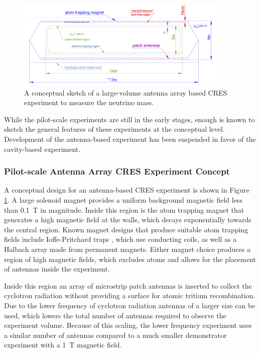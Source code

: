 \begin{figure}[htbp]
    \centering
    \includegraphics*[width=0.9\textwidth]{figs/Chapter-3/phaseiv_concept_sketch_ver2.png}
    \caption{\label{fig:chap3-phaseiv-antenna} A conceptual sketch of a large-volume antenna array based CRES experiment to measure the neutrino mass.}
\end{figure}

While the pilot-scale experiments are still in the early stages, enough is known to sketch the general features of these experiments at the conceptual level. Development of the antenna-based experiment has been suspended in favor of the cavity-based experiment.

\subsubsection*{Pilot-scale Antenna Array CRES Experiment Concept}

A conceptual design for an antenna-based CRES experiment is shown in Figure \ref{fig:chap3-phaseiv-antenna}. A large solenoid magnet provides a uniform background magnetic field less than 0.1~T in magnitude. Inside this region is the atom trapping magnet that generates a high magnetic field at the walls, which decays exponentially towards the central region. 
Known magnet designs that produce suitable atom trapping fields include Ioffe-Pritchard traps \cite{ioffe_trap}, which use conducting coils, as well as a Halbach array \cite{halbach_trap} made from permanent magnets. Either magnet choice produces a region of high magnetic fields, which excludes atoms and allows for the placement of antennas inside the experiment. 

Inside this region an array of microstrip patch antennas is inserted to collect the cyclotron radiation without providing a surface for atomic tritium recombination. Due to the lower frequency of cyclotron radiation antennas of a larger size can be used, which lowers the total number of antennas required to observe the experiment volume. Because of this scaling, the lower frequency experiment uses a similar number of antennas compared to a much smaller demonstrator experiment with a 1~T magnetic field.

